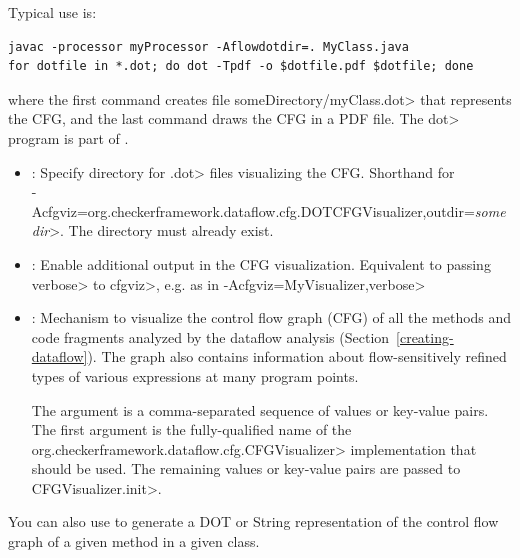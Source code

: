 Typical use is:

\begin{Verbatim}
javac -processor myProcessor -Aflowdotdir=. MyClass.java
for dotfile in *.dot; do dot -Tpdf -o $dotfile.pdf $dotfile; done
\end{Verbatim}

\noindent
where the first command creates file \<someDirectory/myClass.dot> that
represents the CFG, and the last command draws the CFG in a PDF file.
The \<dot> program is part of .


\begin{itemize}

\item {}:
  Specify directory for \<.dot> files visualizing the CFG\@.
  Shorthand for\\
  \<-Acfgviz=org.checkerframework.dataflow.cfg.DOTCFGVisualizer,outdir=\emph{somedir}>.
  The directory must already exist.

\item {}:
  Enable additional output in the CFG visualization.
  Equivalent to passing \<verbose> to \<cfgviz>, e.g. as in
  \<-Acfgviz=MyVisualizer,verbose>

\item {}:
  Mechanism to visualize the control flow graph (CFG) of
  all the methods and code fragments
  analyzed by the dataflow analysis (Section~\ref{creating-dataflow}).
  The graph also contains information about flow-sensitively refined
  types of various expressions at many program points.

  The argument is a comma-separated sequence of values or key-value pairs.
  The first argument is the fully-qualified name of the
  \<org.checkerframework.dataflow.cfg.CFGVisualizer> implementation
  that should be used. The remaining values or key-value pairs are
  passed to \<CFGVisualizer.init>.

\end{itemize}

\noindent
You can also use  to generate a DOT
or String representation of the control flow graph of a given method in a given class.

